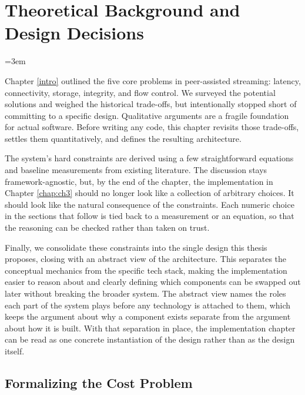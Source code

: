 \chapter{Theoretical Background and Design Decisions}
\label{chap:ch2}

\emergencystretch=3em

\indent \par Chapter \ref{intro} outlined the five core problems in peer-assisted streaming: latency, connectivity, storage, integrity, and flow control. We surveyed the potential solutions and weighed the historical trade-offs, but intentionally stopped short of committing to a specific design. Qualitative arguments are a fragile foundation for actual software. Before writing any code, this chapter revisits those trade-offs, settles them quantitatively, and defines the resulting architecture.

\par The system's hard constraints are derived using a few straightforward equations and baseline measurements from existing literature. The discussion stays framework-agnostic, but, by the end of the chapter, the implementation in Chapter \ref{chap:ch3} should no longer look like a collection of arbitrary choices. It should look like the natural consequence of the constraints. Each numeric choice in the sections that follow is tied back to a measurement or an equation, so that the reasoning can be checked rather than taken on trust.

\par Finally, we consolidate these constraints into the single design this thesis proposes, closing with an abstract view of the architecture. This separates the conceptual mechanics from the specific tech stack, making the implementation easier to reason about and clearly defining which components can be swapped out later without breaking the broader system. The abstract view names the roles each part of the system plays before any technology is attached to them, which keeps the argument about why a component exists separate from the argument about how it is built. With that separation in place, the implementation chapter can be read as one concrete instantiation of the design rather than as the design itself.

\section{Formalizing the Cost Problem}
\label{sec:delivery-models}

